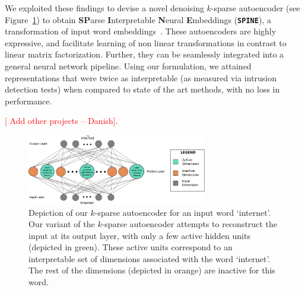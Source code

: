 \documentclass{article}
\newcommand{\dd}[1]{\textcolor{red}{[  #1 -- Danish]}\typeout{#1}}
\begin{document}
We exploited these findings 
 to devise a novel denoising $k$-sparse autoencoder (see Figure~\ref{fig:autoencoder}) to obtain \textbf{SP}arse \textbf{I}nterpretable \textbf{N}eural \textbf{E}mbeddings (\textbf{\texttt{SPINE}}), a transformation of input word embeddings~\cite{pruthi2018spine}.
 These autoencoders are highly expressive, and facilitate learning of non linear transformations in contrast to linear matrix factorization. Further, they can be seamlessly integrated into a general neural network pipeline. Using our formulation, we attained representations that were twice as interpretable (as measured via intrusion detection tests) when compared to state of the art methods, with no loss in performance. 

 \dd{Add other projects}.


\begin{figure}[t]
\centering
\includegraphics[width=0.70\textwidth]{autoencoder_detailed}
\caption{Depiction of our $k$-sparse autoencoder for an input word `internet'. Our variant of the $k$-sparse autoencoder attempts to reconstruct the input at its output layer,
with only a few active hidden units (depicted in green). These active units correspond to an interpretable set of dimensions associated with the word `internet'. The rest of the dimensions (depicted in orange) are inactive for this word.}
\label{fig:autoencoder}
\end{figure}







\end{document}
